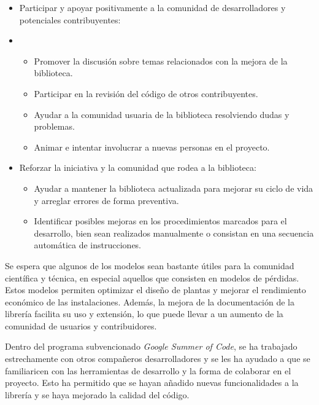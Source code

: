\begin{itemize}
    \item Participar y apoyar positivamente a la comunidad de desarrolladores y potenciales contribuyentes:
    \item \begin{itemize}
        \item Promover la discusión sobre temas relacionados con la mejora de la biblioteca.

        \item Participar en la revisión del código de otros contribuyentes.
    
        \item Ayudar a la comunidad usuaria de la biblioteca resolviendo dudas y problemas.
    
        \item Animar e intentar involucrar a nuevas personas en el proyecto.
    \end{itemize}

    \item Reforzar la iniciativa y la comunidad que rodea a la biblioteca:
    \begin{itemize}
        \item Ayudar a mantener la biblioteca actualizada para mejorar su ciclo de vida y arreglar errores de forma preventiva.
        
        \item Identificar posibles mejoras en los procedimientos marcados para el desarrollo, bien sean realizados manualmente o consistan en una secuencia automática de instrucciones.
    \end{itemize}

\end{itemize}

Se espera que algunos de los modelos sean bastante útiles para la comunidad científica y técnica, en especial aquellos que consisten en modelos de pérdidas. Estos modelos permiten optimizar el diseño de plantas y mejorar el rendimiento económico de las instalaciones. Además, la mejora de la documentación de la librería \pvlibpy{} facilita su uso y extensión, lo que puede llevar a un aumento de la comunidad de usuarios y contribuidores.

Dentro del programa subvencionado \textit{Google Summer of Code}, se ha trabajado estrechamente con otros compañeros desarrolladores y se les ha ayudado a que se familiaricen con las herramientas de desarrollo y la forma de colaborar en el proyecto. Esto ha permitido que se hayan añadido nuevas funcionalidades a la librería y se haya mejorado la calidad del código.

